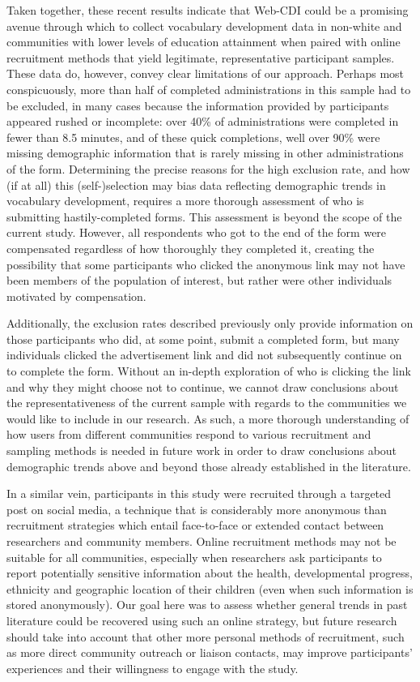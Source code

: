 \documentclass[
  english,
  ,man,floatsintext]{apa6}
\begin{document}
Taken together, these recent results indicate that Web-CDI could be a promising avenue through which to collect vocabulary development data in non-white and communities with lower levels of education attainment when paired with online recruitment methods that yield legitimate, representative participant samples. These data do, however, convey clear limitations of our approach. Perhaps most conspicuously, more than half of completed administrations in this sample had to be excluded, in many cases because the information provided by participants appeared rushed or incomplete: over 40\% of administrations were completed in fewer than 8.5 minutes, and of these quick completions, well over 90\% were missing demographic information that is rarely missing in other administrations of the form. Determining the precise reasons for the high exclusion rate, and how (if at all) this (self-)selection may bias data reflecting demographic trends in vocabulary development, requires a more thorough assessment of who is submitting hastily-completed forms. This assessment is beyond the scope of the current study. However, all respondents who got to the end of the form were compensated regardless of how thoroughly they completed it, creating the possibility that some participants who clicked the anonymous link may not have been members of the population of interest, but rather were other individuals motivated by compensation.

Additionally, the exclusion rates described previously only provide information on those participants who did, at some point, submit a completed form, but many individuals clicked the advertisement link and did not subsequently continue on to complete the form. Without an in-depth exploration of who is clicking the link and why they might choose not to continue, we cannot draw conclusions about the representativeness of the current sample with regards to the communities we would like to include in our research. As such, a more thorough understanding of how users from different communities respond to various recruitment and sampling methods is needed in future work in order to draw conclusions about demographic trends above and beyond those already established in the literature.

In a similar vein, participants in this study were recruited through a targeted post on social media, a technique that is considerably more anonymous than recruitment strategies which entail face-to-face or extended contact between researchers and community members. Online recruitment methods may not be suitable for all communities, especially when researchers ask participants to report potentially sensitive information about the health, developmental progress, ethnicity and geographic location of their children (even when such information is stored anonymously). Our goal here was to assess whether general trends in past literature could be recovered using such an online strategy, but future research should take into account that other more personal methods of recruitment, such as more direct community outreach or liaison contacts, may improve participants' experiences and their willingness to engage with the study.
\end{document}
